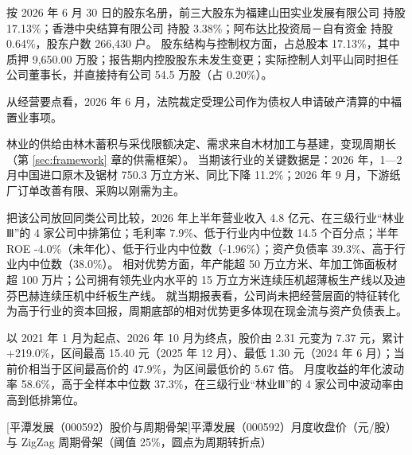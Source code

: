  按 2026 年 6 月 30 日的股东名册，前三大股东为福建山田实业发展有限公司 持股 17.13\%；香港中央结算有限公司 持股 3.38\%；阿布达比投资局－自有资金 持股 0.64\%，股东户数 266,430 户。 股东结构与控制权方面，占总股本 17.13\%，其中质押 9,650.00 万股；报告期内控股股东未发生变更；实际控制人刘平山同时担任公司董事长，并直接持有公司 54.5 万股（占 0.20\%）。

 从经营要点看，2026 年 6 月，法院裁定受理公司作为债权人申请破产清算的中福置业事项。

 林业的供给由林木蓄积与采伐限额决定、需求来自木材加工与基建，变现周期长（第 \ref{sec:framework} 章的供需框架）。 当期该行业的关键数据是：2026 年，1—2 月中国进口原木及锯材 750.3 万立方米、同比下降 11.2\%；2026 年 9 月，下游纸厂订单改善有限、采购以刚需为主。

 把该公司放回同类公司比较，2026 年上半年营业收入 4.8 亿元、在三级行业“林业Ⅲ”的 4 家公司中排第位；毛利率 7.9\%、低于行业内中位数 14.5 个百分点；半年 ROE -4.0\%（未年化）、低于行业内中位数（-1.96\%）；资产负债率 39.3\%、高于行业内中位数（38.0\%）。 相对优势方面，年产能超 50 万立方米、年加工饰面板材超 100 万片；公司拥有领先业内水平的 15 万立方米连续压机超薄板生产线以及迪芬巴赫连续压机中纤板生产线。 就当期报表看，公司尚未把经营层面的特征转化为高于行业的资本回报，周期底部的相对优势更多体现在现金流与资产负债表上。

 以 2021 年 1 月为起点、2026 年 10 月为终点，股价由 2.31 元变为 7.37 元，累计 +219.0\%，区间最高 15.40 元（2025 年 12 月）、最低 1.30 元（2024 年 6 月）；当前价相当于区间最高价的 47.9\%，为区间最低价的 5.67 倍。 月度收益的年化波动率 58.6\%，高于全样本中位数 37.3\%，在三级行业“林业Ⅲ”的 4 家公司中波动率由高到低排第位。

\begin{center}
\begin{minipage}{\textwidth}\centering
{}

[平潭发展（000592）股价与周期骨架]{平潭发展（000592）月度收盘价（元/股）与 ZigZag 周期骨架（阈值 25\%，圆点为周期转折点）}
\end{minipage}
\end{center}

